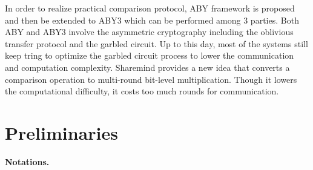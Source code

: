 \documentclass[letterpaper]{article} %
\begin{document}
    In order to realize practical comparison protocol, ABY framework \cite{ABY} is proposed
    and then be extended to ABY3 \cite{ABY3} which can be performed among 3 parties.
    Both ABY and ABY3 involve the asymmetric cryptography
    including the oblivious transfer protocol and the garbled circuit.
    Up to this day, most of the systems \cite{2022GarbledCircuit} still keep tring to optimize
    the garbled circuit process to lower the communication and computation complexity.
    Sharemind \cite{Sharemind} provides a new idea that converts a comparison operation to
    multi-round bit-level multiplication.
    Though it lowers the computational difficulty, it costs too much rounds for
    communication.

\section{Preliminaries}
    \textbf{Notations.}
\end{document}
